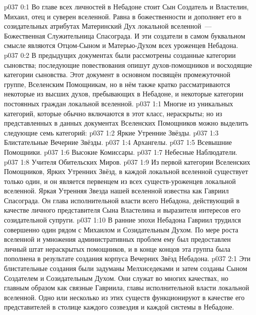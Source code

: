 \author{Блистательная Вечерняя Звезда}
\vs p037 0:1 Во главе всех личностей в Небадоне стоит Сын Создатель и Властелин, Михаил, отец и суверен вселенной. Равна в божественности и дополняет его в созидательных атрибутах Материнский Дух локальной вселенной~--- Божественная Служительница Спасограда. И эти создатели в самом буквальном смысле являются Отцом\hyp{}Сыном и Матерью\hyp{}Духом всех уроженцев Небадона.
\vs p037 0:2 В предыдущих документах были рассмотрены созданные категории сыновства; последующие повествования опишут духов\hyp{}помощников и восходящие категории сыновства. Этот документ в основном посвящён промежуточной группе, Вселенским Помощникам, но в нём также кратко рассматриваются некоторые из высших духов, пребывающих в Небадоне, и некоторые категории постоянных граждан локальной вселенной.
\vs p037 1:1 Многие из уникальных категорий, которые обычно включаются в этот класс, нераскрыты; но из представленных в данных документах Вселенских Помощников можно выделить следующие семь категорий:
\vs p037 1:2 Яркие Утренние Звёзды.
\vs p037 1:3 Блистательные Вечерние Звёзды.
\vs p037 1:4 Архангелы.
\vs p037 1:5 Всевышние Помощники.
\vs p037 1:6 Высокие Комиссары.
\vs p037 1:7 Небесные Наблюдатели.
\vs p037 1:8 Учителя Обительских Миров.
\vs p037 1:9 \pc Из первой категории Вселенских Помощников, Ярких Утренних Звёзд, в каждой локальной вселенной существует только один, и он является первенцем из всех существ\hyp{}уроженцев локальной вселенной. Яркая Утренняя Звезда нашей вселенной известна как Гавриил Спасограда. Он глава исполнительной власти всего Небадона, действующий в качестве личного представителя Сына Властелина и выразителя интересов его созидательной супруги.
\vs p037 1:10 В ранние эпохи Небадона Гавриил трудился совершенно один рядом с Михаилом и Созидательным Духом. По мере роста вселенной и умножения административных проблем ему был предоставлен личный штат нераскрытых помощников, и в конце концов эта группа была пополнена в результате создания корпуса Вечерних Звёзд Небадона.
\vs p037 2:1 Эти блистательные создания были задуманы Мелхиседеками и затем созданы Сыном Создателем и Созидательным Духом. Они служат во многих качествах, но главным образом как связные Гавриила, главы исполнительной власти локальной вселенной. Одно или несколько из этих существ функционируют в качестве его представителей в столице каждого созвездия и каждой системы в Небадоне.
